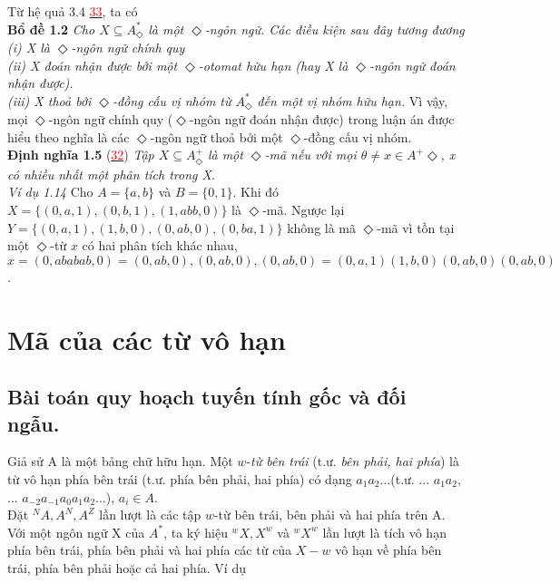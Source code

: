 \begin{flushleft}
\hspace{10mm}Từ hệ quả 3.4 \hyperlink{page.81}{\textcolor{red}{33}}, ta có\\
\textbf{Bổ đề 1.2} \textit{Cho $X \subseteq A^*_\Diamond$ là một $\Diamond$-ngôn ngữ. Các điều kiện sau đây tương đương\\
\hspace{20mm}(i) X là $\Diamond$-ngôn ngữ chính quy \\
\hspace{20mm}(ii) X đoán nhận được bởi một $\Diamond$-otomat hữu hạn (hay X là $\Diamond$-ngôn ngữ đoán nhận được).\\
\hspace{20mm}(iii) X thoả bởi $\Diamond$-đồng cấu vị nhóm từ $A^*_\Diamond$ đến một vị nhóm hữu hạn.
}
Vì vậy, mọi $\Diamond$-ngôn ngữ chính quy ($\Diamond$-ngôn ngữ đoán nhận được) trong luận án được hiểu theo nghĩa là các $\Diamond$-ngôn ngữ thoả bởi một $\Diamond$-đồng cấu vị nhóm.\\
\textbf{Định nghĩa 1.5} (\hyperlink{page.81}{\textcolor{red}{32}})  \textit{Tập $X \subseteq A^+_\Diamond$ là một $\Diamond$-mã nếu với mọi $\theta \ne x \in A^+\Diamond$, x có nhiều nhất một phân tích trong X}.\\
\textit{Ví dụ 1.14}     Cho $A = \{ a,b \}$ và $B = \{ 0,1 \}$. Khi đó $X = \{ (0,a,1), (0,b,1), (1,abb,0) \}$ là $\Diamond$-mã. Ngược lại $Y = \{ (0,a,1), (1,b,0), (0,ab,0), (0, ba, 1) \}$ không là mã $\Diamond$-mã vì tồn tại một $\Diamond$-từ $x$ có hai phân tích khác nhau, $x = (0,ababab,0) = (0,ab,0), (0,ab,0), (0,ab,0) = (0,a,1)(1,b,0)(0,ab,0)(0,ab,0)$.\\
\section{Mã của các từ vô hạn}
\subsection{Bài toán quy hoạch tuyến tính gốc và đối ngẫu.}
Giả sử A là một bảng chữ hữu hạn. Một $w$-\textit{từ bên trái} (t.ư. \textit{bên phải, hai phía}) là từ vô hạn phía bên trái (t.ư. phía bên phải, hai phía) có dạng $a_1a_2...$(t.ư. ... $a_1a_2$, ... $a_{-2}a_{-1}a_0a_1a_2$...), $a_i \in A$.\\
\hspace{10mm}Đặt $^NA, A^N, A^Z$ lần lượt là các tập $w$-từ bên trái, bên phải và hai phía trên A. Với một ngôn ngữ X của $A^*$, ta ký hiệu $^wX, X^w$ và $^wX^w$ lần lượt là tích vô hạn phía bên trái, phía bên phải và hai phía các từ của $X - w$ vô hạn về phía bên trái, phía bên phải hoặc cả hai phía. Ví dụ
\end{flushleft}
